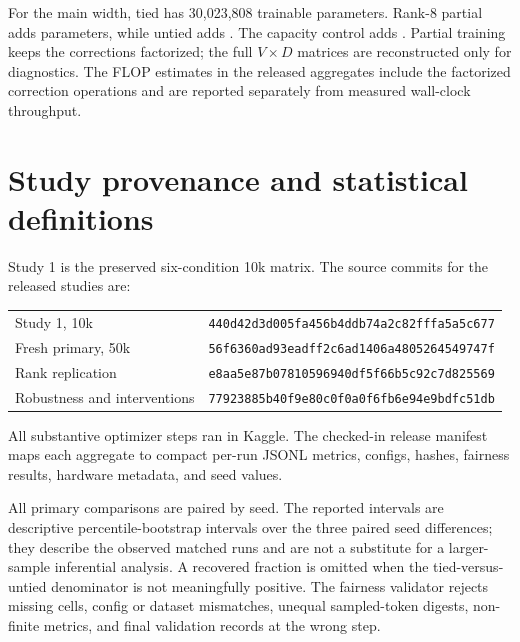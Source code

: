 \documentclass[11pt]{article}
\begin{document}
For the main width, tied has 30,023,808 trainable parameters. Rank-8 partial adds \PartialExtraParams{} parameters, while untied adds \UntiedExtraParams{}. The capacity control adds \CapacityExtraParams{}. Partial training keeps the corrections factorized; the full $V\times D$ matrices are reconstructed only for diagnostics. The FLOP estimates in the released aggregates include the factorized correction operations and are reported separately from measured wall-clock throughput.

\section{Study provenance and statistical definitions}

Study 1 is the preserved six-condition 10k matrix. The source commits for the released studies are:

\begin{center}
\small
\begin{tabular}{ll}
Study 1, 10k & \texttt{440d42d3d005fa456b4ddb74a2c82fffa5a5c677} \\
Fresh primary, 50k & \texttt{56f6360ad93eadff2c6ad1406a4805264549747f} \\
Rank replication & \texttt{e8aa5e87b07810596940df5f66b5c92c7d825569} \\
Robustness and interventions & \texttt{77923885b40f9e80c0f0a0f6fb6e94e9bdfc51db}
\end{tabular}
\end{center}

All substantive optimizer steps ran in Kaggle. The checked-in release manifest maps each aggregate to compact per-run JSONL metrics, configs, hashes, fairness results, hardware metadata, and seed values.

All primary comparisons are paired by seed. The reported intervals are descriptive percentile-bootstrap intervals over the three paired seed differences; they describe the observed matched runs and are not a substitute for a larger-sample inferential analysis. A recovered fraction is omitted when the tied-versus-untied denominator is not meaningfully positive. The fairness validator rejects missing cells, config or dataset mismatches, unequal sampled-token digests, non-finite metrics, and final validation records at the wrong step.



\end{document}
